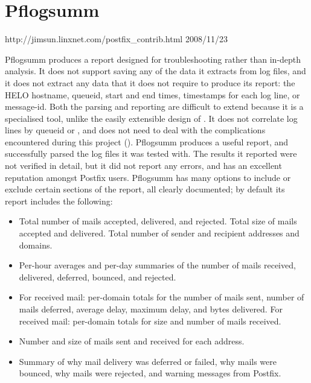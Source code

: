 \section{Pflogsumm}

{http://jimsun.linxnet.com/postfix_contrib.html}
{2008/11/23}

Pflogsumm produces a report designed for troubleshooting rather than
in-depth analysis.  It does not support saving any of the data it extracts
from log files, and it does not extract any data that it does not require
to produce its report: the HELO hostname, queueid, start and end times,
timestamps for each log line, or message-id.  Both the parsing and
reporting are difficult to extend because it is a specialised tool, unlike
the easily extensible design of \parsername{}.  It does not correlate log
lines by queueid or , and does not need to deal with the
complications encountered during this project ().
Pflogsumm produces a useful report, and successfully parsed the
\numberOFlogFILES{} log files it was tested with.  The results it reported
were not verified in detail, but it did not report any errors, and has an
excellent reputation amongst Postfix users.  Pflogsumm has many options to
include or exclude certain sections of the report, all clearly documented;
by default its report includes the following:

\begin{itemize}

    \item Total number of mails accepted, delivered, and rejected.  Total
        size of mails accepted and delivered.  Total number of sender and
        recipient addresses and domains.

    \item Per-hour averages and per-day summaries of the number of mails
        received, delivered, deferred, bounced, and rejected.

    \item For received mail: per-domain totals for the number of mails
        sent, number of mails deferred, average delay, maximum delay, and
        bytes delivered.  For received mail: per-domain totals for size and
        number of mails received.

    \item Number and size of mails sent and received for each address.

    \item Summary of why mail delivery was deferred or failed, why mails
        were bounced, why mails were rejected, and warning messages from
        Postfix.

\end{itemize}

